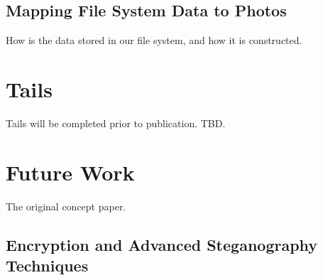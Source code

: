 \documentclass[12pt,journal,compsoc]{IEEEtran}
\begin{document}
\subsection{Mapping File System Data to Photos}

How is the data stored in our file system, and how it is constructed.






\section{Tails}

Tails will be completed prior to publication. TBD. 

\section{Future Work}

The original concept paper\cite{Baliga2007}.

\subsection{Encryption and Advanced Steganography Techniques}
\end{document}
